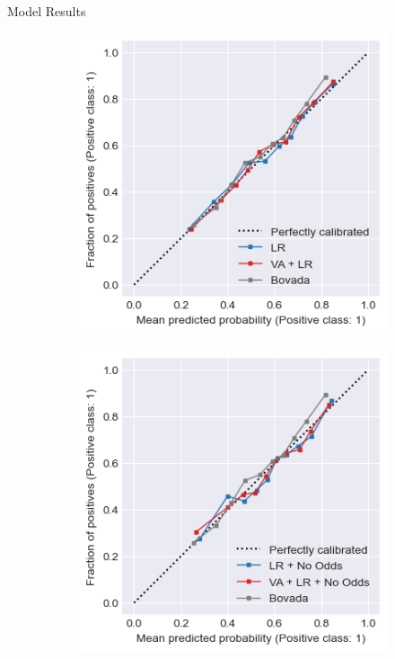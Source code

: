 \documentclass[final]{beamer}
\newlength{\colwidth}
\begin{document}
\begin{frame}[t]
\begin{columns}[t]
\begin{column}{\colwidth}
\begin{block}{Model Results}
\begin{figure}
\begin{subfigure}{.24\linewidth}
            \includegraphics[width=\linewidth]{figures/lr_and_va.png}
        \end{subfigure}
        \begin{subfigure}{.24\linewidth}
            \centering
            \includegraphics[width=\linewidth]{figures/lr_no_odds_and_va.png}

\end{subfigure}
\end{figure}
\end{block}
\end{column}
\end{columns}
\end{frame}
\end{document}
